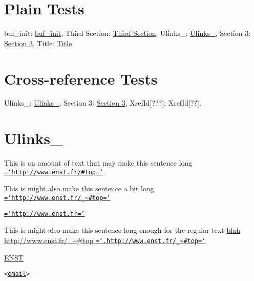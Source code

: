 \documentclass[pdftex,english,a4paper,10pt]{article}
\author{Ramon Casellas \and James Devenish}
\newcommand{\docbookhyphenateurl}[1]{{\hyphenchar\font=`\/\relax #1\hyphenchar\font=`\-}}
\newcommand{\docbookhyphenatedot}[1]{{\hyphenchar\font=`.\relax #1\hyphenchar\font=`\-}}
\begin{document}
\maketitle

\section{Plain Tests}
\label{id2779357}\hypertarget{id2779357}{}%

buf\_init: \hyperlink{buf-init}{buf\_init},
Third Section:
\hyperlink{sec:ulinks}{Third Section},
Ulinks\_:
\hyperlink{sec:ulinks}{Ulinks\_},
Section 3:
\hyperlink{sec:ulinks}{Section {\ref*{sec:ulinks}}}.
Title:
\hyperlink{title:ulinks}{Title}.

\section{Cross-reference Tests}
\label{id2718611}\hypertarget{id2718611}{}%

Ulinks\_:
\hyperlink{sec:ulinks}{Ulinks\_},
Section 3:
\hyperlink{sec:ulinks}{Section {\ref*{sec:ulinks}}},
XrefId[???]:
XrefId[??].

\section{Ulinks\_}
\label{sec:ulinks}\hypertarget{sec:ulinks}{}%
\hypertarget{buf-init}{}
This is an amount of text that may make this sentence long
  \href{http://www.enst.fr/#top}{\texttt{\docbookhyphenateurl{http://www.enst.fr/\#top}}} 

This is might also make this sentence a bit long
  \href{http://www.enst.fr/_~#top}{\texttt{\docbookhyphenateurl{http://www.enst.fr/\_\textasciitilde \#top}}} 

\href{http://www.enst.fr}{\texttt{\docbookhyphenateurl{http://www.enst.fr}}}

This is might also make this sentence long enough for the regular text
  \href{http://www.enst.fr/#top}{blah http://www.enst.fr/\_\textasciitilde \#top {\tt\docbookhyphenatedot{http://www.enst.fr/\_\textasciitilde \#top}}}

\href{http://www.enst.fr}{ENST}

\texttt{<\href{mailto:email}{email}>}
\end{document}
